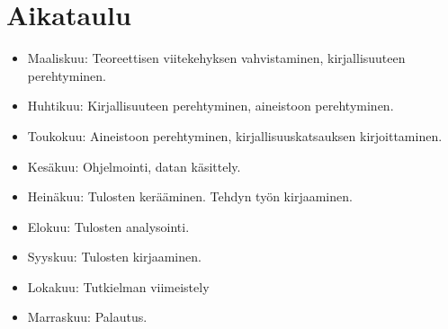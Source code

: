 \documentclass[utf8]{gradu3}
\begin{document}
\chapter{Aikataulu}
\begin{itemize}
  \item Maaliskuu: Teoreettisen viitekehyksen vahvistaminen, kirjallisuuteen perehtyminen.
  \item Huhtikuu:  Kirjallisuuteen perehtyminen, aineistoon perehtyminen.
  \item Toukokuu:  Aineistoon perehtyminen, kirjallisuuskatsauksen kirjoittaminen.
  \item Kesäkuu:   Ohjelmointi, datan käsittely.
  \item Heinäkuu:  Tulosten kerääminen. Tehdyn työn kirjaaminen.
  \item Elokuu:    Tulosten analysointi.
  \item Syyskuu:   Tulosten kirjaaminen.
  \item Lokakuu:   Tutkielman viimeistely
  \item Marraskuu: Palautus.
\end{itemize}

\printbibliography
\end{document}

